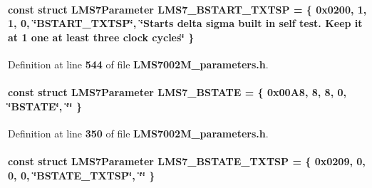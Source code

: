 \paragraph[{L\+M\+S7\+\_\+\+B\+S\+T\+A\+R\+T\+\_\+\+T\+X\+T\+SP}]{\setlength{\rightskip}{0pt plus 5cm}const struct {\bf L\+M\+S7\+Parameter} L\+M\+S7\+\_\+\+B\+S\+T\+A\+R\+T\+\_\+\+T\+X\+T\+SP = \{ 0x0200, 1, 1, 0, \char`\"{}\+B\+S\+T\+A\+R\+T\+\_\+\+T\+X\+T\+S\+P\char`\"{}, \char`\"{}\+Starts delta sigma built in self test. Keep it at 1 one at least three clock cycles\char`\"{} \}\hspace{0.3cm}{\ttfamily [static]}}\label{LMS7002M__parameters_8h_a326ca37737c89a242009b8cbf9864149}


Definition at line {\bf 544} of file {\bf L\+M\+S7002\+M\+\_\+parameters.\+h}.

\paragraph[{L\+M\+S7\+\_\+\+B\+S\+T\+A\+TE}]{\setlength{\rightskip}{0pt plus 5cm}const struct {\bf L\+M\+S7\+Parameter} L\+M\+S7\+\_\+\+B\+S\+T\+A\+TE = \{ 0x00\+A8, 8, 8, 0, \char`\"{}\+B\+S\+T\+A\+T\+E\char`\"{}, \char`\"{}\char`\"{} \}\hspace{0.3cm}{\ttfamily [static]}}\label{LMS7002M__parameters_8h_a6780e87a2e4e1884522a11f2d9b00977}


Definition at line {\bf 350} of file {\bf L\+M\+S7002\+M\+\_\+parameters.\+h}.

\paragraph[{L\+M\+S7\+\_\+\+B\+S\+T\+A\+T\+E\+\_\+\+T\+X\+T\+SP}]{\setlength{\rightskip}{0pt plus 5cm}const struct {\bf L\+M\+S7\+Parameter} L\+M\+S7\+\_\+\+B\+S\+T\+A\+T\+E\+\_\+\+T\+X\+T\+SP = \{ 0x0209, 0, 0, 0, \char`\"{}\+B\+S\+T\+A\+T\+E\+\_\+\+T\+X\+T\+S\+P\char`\"{}, \char`\"{}\char`\"{} \}\hspace{0.3cm}{\ttfamily [static]}}\label{LMS7002M__parameters_8h_a3a0b2202023bc56b3fdc6ea9847a6bce}


